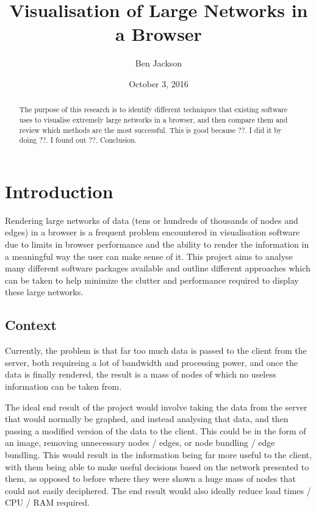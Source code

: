 \documentclass{l4proj}
\begin{document}
\title{Visualisation of Large Networks in a Browser}
\author{Ben Jackson}
\date{October 3, 2016}
\maketitle

\begin{abstract}
The purpose of this research is to identify different techniques that existing software uses to visualise extremely large networks in a browser, and then compare them and review which methods are the most successful. This is good because ??. I did it by doing ??. I found out ??. Conclusion.
\end{abstract}

\educationalconsent
%
%

\tableofcontents

\chapter{Introduction}

Rendering large networks of data (tens or hundreds of thousands of nodes and edges) in a browser is a frequent problem encountered in visualisation software due to limits in browser performance and the ability to render the information in a meaningful way the user can make sense of it. This project aims to analyse many different software packages available and outline different approaches which can be taken to help minimize the clutter and performance required to display these large networks. 
 
\section{Context}
Currently, the problem is that far too much data is passed to the client from the server, both requireing a lot of bandwidth and processing power, and once the data is finally rendered, the result is a mass of nodes of which no useless information can be taken from. 

The ideal end result of the project would involve taking the data from the server that would normally be graphed, and instead analysing that data, and then passing a modified version of the data to the client. This could be in the form of an image, removing unnecessary nodes / edges, or node bundling / edge bundling. This would result in the information being far more useful to the client, with them being able to make useful decisions based on the network presented to them, as opposed to before where they were shown a huge mass of nodes that could not easily deciphered. The end result would also ideally reduce load times / CPU / RAM required. 
\end{document}
